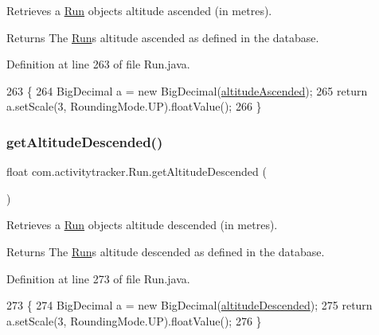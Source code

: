 Retrieves a \mbox{\hyperlink{classcom_1_1activitytracker_1_1_run}{Run}} object\textquotesingle{}s altitude ascended (in metres).

\begin{DoxyReturn}{Returns}
The \mbox{\hyperlink{classcom_1_1activitytracker_1_1_run}{Run}}\textquotesingle{}s altitude ascended as defined in the database. 
\end{DoxyReturn}


Definition at line 263 of file Run.\+java.


\begin{DoxyCode}
263                                        \{
264         BigDecimal a = \textcolor{keyword}{new} BigDecimal(\mbox{\hyperlink{classcom_1_1activitytracker_1_1_run_ad28bf8d709b4cfcdb93a51033a90728c}{altitudeAscended}});
265         \textcolor{keywordflow}{return} a.setScale(3, RoundingMode.UP).floatValue();
266     \}
\end{DoxyCode}
\mbox{\label{classcom_1_1activitytracker_1_1_run_a75d18e68f984a4f5481e25f2c70f0492}} 
\subsubsection{\texorpdfstring{get\+Altitude\+Descended()}{getAltitudeDescended()}}
{\footnotesize\ttfamily float com.\+activitytracker.\+Run.\+get\+Altitude\+Descended (\begin{DoxyParamCaption}{ }\end{DoxyParamCaption})}

Retrieves a \mbox{\hyperlink{classcom_1_1activitytracker_1_1_run}{Run}} object\textquotesingle{}s altitude descended (in metres).

\begin{DoxyReturn}{Returns}
The \mbox{\hyperlink{classcom_1_1activitytracker_1_1_run}{Run}}\textquotesingle{}s altitude descended as defined in the database. 
\end{DoxyReturn}


Definition at line 273 of file Run.\+java.


\begin{DoxyCode}
273                                         \{
274         BigDecimal a = \textcolor{keyword}{new} BigDecimal(\mbox{\hyperlink{classcom_1_1activitytracker_1_1_run_a4997349f78c9147a30811306c2ab5223}{altitudeDescended}});
275         \textcolor{keywordflow}{return} a.setScale(3, RoundingMode.UP).floatValue();
276     \}
\end{DoxyCode}
\mbox{\label{classcom_1_1activitytracker_1_1_run_a2d3b805547023d02f99634e09c6fa086}} 
